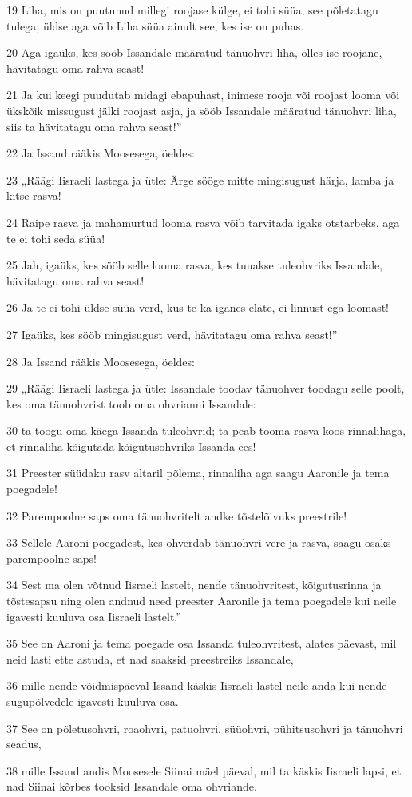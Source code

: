 \par 19 Liha, mis on puutunud millegi roojase külge, ei tohi süüa, see põletatagu tulega; üldse aga võib Liha süüa ainult see, kes ise on puhas.
\par 20 Aga igaüks, kes sööb Issandale määratud tänuohvri liha, olles ise roojane, hävitatagu oma rahva seast!
\par 21 Ja kui keegi puudutab midagi ebapuhast, inimese rooja või roojast looma või ükskõik missugust jälki roojast asja, ja sööb Issandale määratud tänuohvri liha, siis ta hävitatagu oma rahva seast!”
\par 22 Ja Issand rääkis Moosesega, öeldes:
\par 23 „Räägi Iisraeli lastega ja ütle: Ärge sööge mitte mingisugust härja, lamba ja kitse rasva!
\par 24 Raipe rasva ja mahamurtud looma rasva võib tarvitada igaks otstarbeks, aga te ei tohi seda süüa!
\par 25 Jah, igaüks, kes sööb selle looma rasva, kes tuuakse tuleohvriks Issandale, hävitatagu oma rahva seast!
\par 26 Ja te ei tohi üldse süüa verd, kus te ka iganes elate, ei linnust ega loomast!
\par 27 Igaüks, kes sööb mingisugust verd, hävitatagu oma rahva seast!”
\par 28 Ja Issand rääkis Moosesega, öeldes:
\par 29 „Räägi Iisraeli lastega ja ütle: Issandale toodav tänuohver toodagu selle poolt, kes oma tänuohvrist toob oma ohvrianni Issandale:
\par 30 ta toogu oma käega Issanda tuleohvrid; ta peab tooma rasva koos rinnalihaga, et rinnaliha kõigutada kõigutusohvriks Issanda ees!
\par 31 Preester süüdaku rasv altaril põlema, rinnaliha aga saagu Aaronile ja tema poegadele!
\par 32 Parempoolne saps oma tänuohvritelt andke tõstelõivuks preestrile!
\par 33 Sellele Aaroni poegadest, kes ohverdab tänuohvri vere ja rasva, saagu osaks parempoolne saps!
\par 34 Sest ma olen võtnud Iisraeli lastelt, nende tänuohvritest, kõigutusrinna ja tõstesapsu ning olen andnud need preester Aaronile ja tema poegadele kui neile igavesti kuuluva osa Iisraeli lastelt.”
\par 35 See on Aaroni ja tema poegade osa Issanda tuleohvritest, alates päevast, mil neid lasti ette astuda, et nad saaksid preestreiks Issandale,
\par 36 mille nende võidmispäeval Issand käskis Iisraeli lastel neile anda kui nende sugupõlvedele igavesti kuuluva osa.
\par 37 See on põletusohvri, roaohvri, patuohvri, süüohvri, pühitsusohvri ja tänuohvri seadus,
\par 38 mille Issand andis Moosesele Siinai mäel päeval, mil ta käskis Iisraeli lapsi, et nad Siinai kõrbes tooksid Issandale oma ohvriande.

